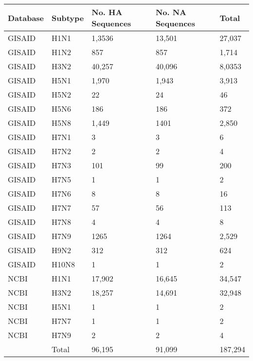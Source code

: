 \begin{tabular}{L{0.5in}|L{0.5in}|L{0.7in}|L{0.7in}|L{0.5in}}\hline
 Database &  Subtype & No.  HA  Sequences & No.  NA  Sequences & Total \\\hline
GISAID&H1N1&1,3536&13,501&27,037\\\hline
GISAID&H1N2&857&857&1,714\\\hline
GISAID&H3N2&40,257&40,096&8,0353\\\hline
GISAID&H5N1&1,970&1,943&3,913\\\hline
GISAID&H5N2&22&24&46\\\hline
GISAID&H5N6&186&186&372\\\hline
GISAID&H5N8&1,449&1401&2,850\\\hline
GISAID&H7N1&3&3&6\\\hline
GISAID&H7N2&2&2&4\\\hline
GISAID&H7N3&101&99&200\\\hline
GISAID&H7N5&1&1&2\\\hline
GISAID&H7N6&8&8&16\\\hline
GISAID&H7N7&57&56&113\\\hline
GISAID&H7N8&4&4&8\\\hline
GISAID&H7N9&1265&1264&2,529\\\hline
GISAID&H9N2&312&312&624\\\hline
GISAID&H10N8&1&1&2\\\hline
NCBI&H1N1&17,902&16,645&34,547\\\hline
NCBI&H3N2&18,257&14,691&32,948\\\hline
NCBI&H5N1&1&1&2\\\hline 
NCBI&H7N7&1&1&2\\\hline
NCBI&H7N9&2&2&4\\\hline
&Total&96,195&91,099&187,294\\\hline
\end{tabular}